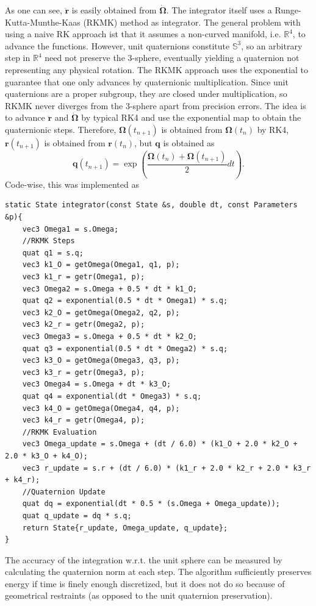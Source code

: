 As one can see, $\ddot{\bm{r}}$ is easily obtained from $\dot{\bm{\Omega}}$. The integrator itself uses a Runge-Kutta-Munthe-Kaas (RKMK) method as integrator. The general problem with using a naive RK approach ist that it assumes a non-curved manifold, i.e. $\mathbb{R}^4$, to advance the functions. However, unit quaternions constitute $\mathbb{S}^3$, so an arbitrary step in $\mathbb{R}^4$ need not preserve the $3$-sphere, eventually yielding a quaternion not representing any physical rotation. The RKMK approach uses the exponential to guarantee that one only advances by quaternionic multiplication. Since unit quaternions are a proper subgroup, they are closed under multiplication, so RKMK never diverges from the $3$-sphere apart from precision errors. The idea is to advance $\ddot{\bm{r}}$ and $\dot{\bm{\Omega}}$ by typical RK4 and use the exponential map to obtain the quaternionic steps. Therefore, $\bm{\Omega}(t_{n+1})$ is obtained from $\bm{\Omega}(t_n)$ by RK4, $\bm{r}(t_{n+1})$ is obtained from $\bm{r}(t_n)$, but $\bm{q}$ is obtained as \[
    \bm{q}(t_{n+1})=\exp \left( \frac{\bm{\Omega}(t_n)+\bm{\Omega}(t_{n+1})}{2}dt\right)
.\]  
Code-wise, this was implemented as 
\begin{lstlisting}
static State integrator(const State &s, double dt, const Parameters &p){
    vec3 Omega1 = s.Omega;
    //RKMK Steps
    quat q1 = s.q;
    vec3 k1_O = getOmega(Omega1, q1, p);
    vec3 k1_r = getr(Omega1, p);
    vec3 Omega2 = s.Omega + 0.5 * dt * k1_O;
    quat q2 = exponential(0.5 * dt * Omega1) * s.q;
    vec3 k2_O = getOmega(Omega2, q2, p);
    vec3 k2_r = getr(Omega2, p);
    vec3 Omega3 = s.Omega + 0.5 * dt * k2_O;
    quat q3 = exponential(0.5 * dt * Omega2) * s.q;
    vec3 k3_O = getOmega(Omega3, q3, p);
    vec3 k3_r = getr(Omega3, p);
    vec3 Omega4 = s.Omega + dt * k3_O;
    quat q4 = exponential(dt * Omega3) * s.q;
    vec3 k4_O = getOmega(Omega4, q4, p);
    vec3 k4_r = getr(Omega4, p);  
    //RKMK Evaluation
    vec3 Omega_update = s.Omega + (dt / 6.0) * (k1_O + 2.0 * k2_O + 2.0 * k3_O + k4_O);
    vec3 r_update = s.r + (dt / 6.0) * (k1_r + 2.0 * k2_r + 2.0 * k3_r + k4_r);
    //Quaternion Update
    quat dq = exponential(dt * 0.5 * (s.Omega + Omega_update));
    quat q_update = dq * s.q;
    return State{r_update, Omega_update, q_update};
}
\end{lstlisting}
The accuracy of the integration w.r.t. the unit sphere can be measured by calculating the quaternion norm at each step. The algorithm sufficiently preserves energy if time is finely enough discretized, but it does not do so because of geometrical restraints (as opposed to the unit quaternion preservation).
